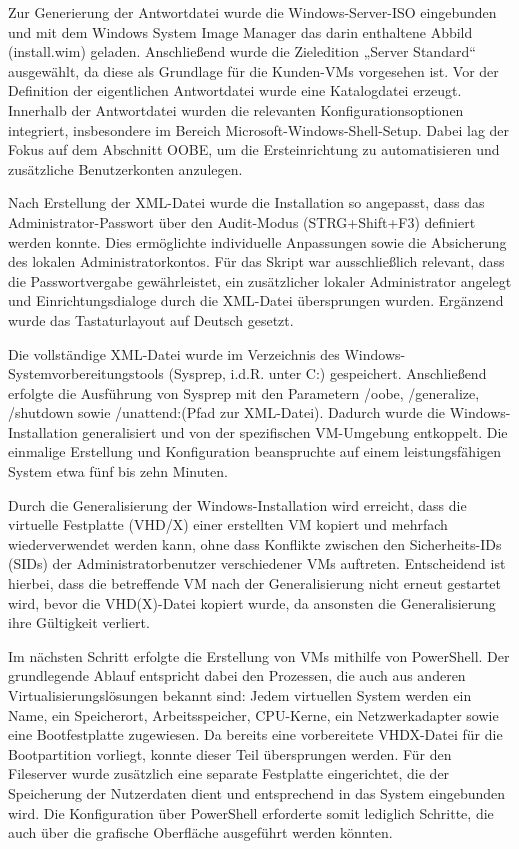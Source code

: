 \documentclass[conference]{IEEEtran}
\begin{document}
Zur Generierung der Antwortdatei wurde die Windows-Server-ISO eingebunden und mit dem Windows System Image Manager das darin enthaltene Abbild (install.wim) geladen. Anschließend wurde die Zieledition „Server Standard“ ausgewählt, da diese als Grundlage für die Kunden-VMs vorgesehen ist. Vor der Definition der eigentlichen Antwortdatei wurde eine Katalogdatei erzeugt. Innerhalb der Antwortdatei wurden die relevanten Konfigurationsoptionen integriert, insbesondere im Bereich Microsoft-Windows-Shell-Setup. Dabei lag der Fokus auf dem Abschnitt OOBE, um die Ersteinrichtung zu automatisieren und zusätzliche Benutzerkonten anzulegen.

Nach Erstellung der XML-Datei wurde die Installation so angepasst, dass das Administrator-Passwort über den Audit-Modus (STRG+Shift+F3) definiert werden konnte. Dies ermöglichte individuelle Anpassungen sowie die Absicherung des lokalen Administratorkontos. Für das Skript war ausschließlich relevant, dass die Passwortvergabe gewährleistet, ein zusätzlicher lokaler Administrator angelegt und Einrichtungsdialoge durch die XML-Datei übersprungen wurden. Ergänzend wurde das Tastaturlayout auf Deutsch gesetzt.

Die vollständige XML-Datei wurde im Verzeichnis des Windows-Systemvorbereitungstools (Sysprep, i.d.R. unter C:\Windows{}\Sysprep) gespeichert. Anschließend erfolgte die Ausführung von Sysprep mit den Parametern /oobe, /generalize, /shutdown sowie /unattend:(Pfad zur XML-Datei). Dadurch wurde die Windows-Installation generalisiert und von der spezifischen VM-Umgebung entkoppelt. Die einmalige Erstellung und Konfiguration beanspruchte auf einem leistungsfähigen System etwa fünf bis zehn Minuten.

Durch die Generalisierung der Windows-Installation wird erreicht, dass die virtuelle Festplatte (VHD/X) einer erstellten VM kopiert und mehrfach wiederverwendet werden kann, ohne dass Konflikte zwischen den Sicherheits-IDs (SIDs) der Administratorbenutzer verschiedener VMs auftreten. Entscheidend ist hierbei, dass die betreffende VM nach der Generalisierung nicht erneut gestartet wird, bevor die VHD(X)-Datei kopiert wurde, da ansonsten die Generalisierung ihre Gültigkeit verliert.

Im nächsten Schritt erfolgte die Erstellung von VMs mithilfe von PowerShell. Der grundlegende Ablauf entspricht dabei den Prozessen, die auch aus anderen Virtualisierungslösungen bekannt sind: Jedem virtuellen System werden ein Name, ein Speicherort, Arbeitsspeicher, CPU-Kerne, ein Netzwerkadapter sowie eine Bootfestplatte zugewiesen. Da bereits eine vorbereitete VHDX-Datei für die Bootpartition vorliegt, konnte dieser Teil übersprungen werden. Für den Fileserver wurde zusätzlich eine separate Festplatte eingerichtet, die der Speicherung der Nutzerdaten dient und entsprechend in das System eingebunden wird. Die Konfiguration über PowerShell erforderte somit lediglich Schritte, die auch über die grafische Oberfläche ausgeführt werden könnten.
\end{document}
